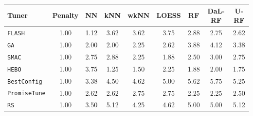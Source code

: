 \begin{tabular}{lcccccccc}
\toprule
\textbf{Tuner} & \textbf{Penalty} & \textbf{NN} & \textbf{kNN} & \textbf{wkNN} & \textbf{LOESS} & \textbf{RF} & \textbf{DaL-RF} & \textbf{U-RF} \\
\midrule
\texttt{FLASH} & \cellcolor{blue!15}1.00 & \cellcolor{blue!15}1.12 & 3.62 & 3.62 & 3.75 & 2.88 & 2.75 & 2.62 \\
\texttt{GA} & \cellcolor{blue!15}1.00 & \cellcolor{red!15}2.00 & \cellcolor{red!15}2.00 & \cellcolor{red!15}2.25 & 2.62 & 3.88 & 4.12 & 3.38 \\
\texttt{SMAC} & \cellcolor{blue!15}1.00 & 2.75 & 2.88 & \cellcolor{red!15}2.25 & \cellcolor{blue!15}1.88 & 2.50 & 3.00 & 2.75 \\
\texttt{HEBO} & \cellcolor{blue!15}1.00 & 3.75 & \cellcolor{blue!15}1.25 & \cellcolor{blue!15}1.50 & \cellcolor{red!15}2.25 & \cellcolor{blue!15}1.88 & \cellcolor{blue!15}2.00 & \cellcolor{blue!15}1.75 \\
\texttt{BestConfig} & \cellcolor{blue!15}1.00 & 3.38 & 4.50 & 4.62 & 5.00 & 5.62 & 5.75 & 5.25 \\
\texttt{PromiseTune} & \cellcolor{blue!15}1.00 & 2.62 & 2.62 & 2.75 & 2.75 & \cellcolor{red!15}2.25 & \cellcolor{red!15}2.25 & \cellcolor{red!15}2.50 \\
\texttt{RS} & \cellcolor{blue!15}1.00 & 3.50 & 5.12 & 4.25 & 4.62 & 5.00 & 5.00 & 5.12 \\
\bottomrule
\end{tabular}
